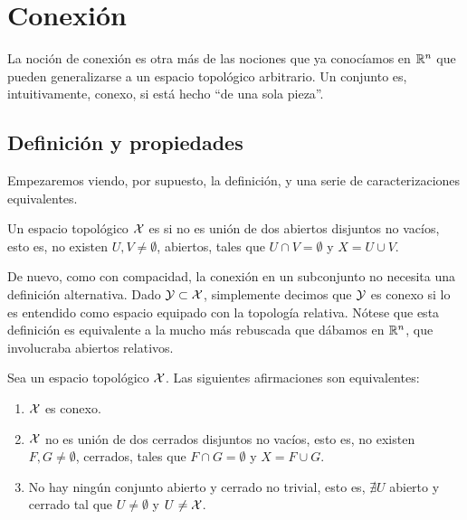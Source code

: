 \chapter{Conexión}
\label{conex}

La noción de conexión es otra más de las nociones que ya conocíamos en $\mathbb{R}^n$ que pueden generalizarse a un espacio topológico arbitrario. Un conjunto es, intuitivamente, conexo, si está hecho ``de una sola pieza''. 

\section{Definición y propiedades}

Empezaremos viendo, por supuesto, la definición, y una serie de caracterizaciones equivalentes.

\begin{defi}[Conexión]
	Un espacio topológico $\mathcal{X}$ es   si no es unión de dos abiertos disjuntos no vacíos, esto es, no existen $U,V\neq\emptyset$, abiertos, tales que $U\cap V=\emptyset$ y $X=U\cup V$.
\end{defi}

\begin{obs}
	De nuevo, como con compacidad, la conexión en un subconjunto no necesita una definición alternativa. Dado $\mathcal{Y}\subset\mathcal{X}$, simplemente decimos que $\mathcal{Y}$ es conexo si lo es entendido como espacio equipado con la topología relativa. Nótese que esta definición es equivalente a la mucho más rebuscada que dábamos en $\mathbb{R}^n$, que involucraba abiertos relativos.
\end{obs}

\begin{prop}
	Sea un espacio topológico $\mathcal{X}$. Las siguientes afirmaciones son equivalentes:
	\begin{enumerate}
		\item $\mathcal{X}$ es conexo.
		\item $\mathcal{X}$ no es unión de dos cerrados disjuntos no vacíos, esto es, no existen $F,G\neq\emptyset$, cerrados, tales que $F\cap G=\emptyset$ y $X=F\cup G$.
		\item No hay ningún conjunto abierto y cerrado no trivial, esto es, $\nexists U$ abierto y cerrado tal que $U\neq\emptyset$ y $U\neq\mathcal{X}$.
	\end{enumerate}
\end{prop}


